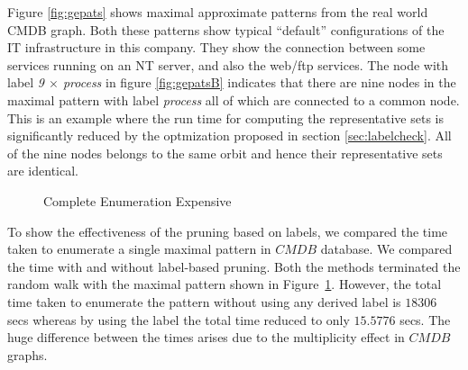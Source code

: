 \smallskip{}
Figure \ref{fig:gepats} shows maximal approximate
patterns from the real world CMDB graph. Both these patterns show
typical ``default'' 
configurations of the IT infrastructure in this company. They show the
connection between some services running on an NT server, and also the
web/ftp services. The node with label \textit{9 $\times$ process} 
in figure \ref{fig:gepatsB} indicates that there are nine nodes 
in the maximal pattern with label \textit{process} all of which
are connected to a common node. This is an example where the run time
for computing the representative sets is significantly reduced by
the optmization proposed in section \ref{sec:labelcheck}. All of the nine
nodes belongs to the same orbit and hence their representative sets are
identical.




\begin{figure}
    \centering
    \caption{Complete Enumeration Expensive}
    \label{fig:geex}
\end{figure}



To show the effectiveness of the pruning based on labels, we compared
the time taken to enumerate a single maximal pattern in $CMDB$ database.
We compared the time with and without label-based pruning.
Both the methods terminated the random walk with the maximal pattern
shown in Figure~\ref{fig:geex}.  
However, the total time taken to enumerate the pattern
without using any derived label is $18306$ secs whereas by using the
\ncl label the total time reduced to only $15.5776$ secs. The huge
difference between the times arises due to the multiplicity effect in
$CMDB$ graphs.  


